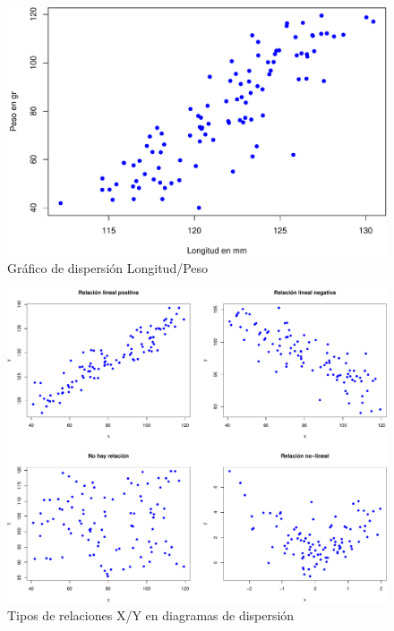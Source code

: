 \documentclass[]{article}
\numberwithin{equation}{section}
\begin{document}
\begin{figure}

{\centering \includegraphics{tema3_files/figure-latex/unnamed-chunk-2-1} 

}

\caption{Gráfico de dispersión Longitud/Peso}\label{fig:unnamed-chunk-2}
\end{figure}

\begin{figure}

{\centering \includegraphics{tema3_files/figure-latex/unnamed-chunk-3-1} 

}

\caption{Tipos de relaciones X/Y en diagramas de dispersión}\label{fig:unnamed-chunk-3}
\end{figure}
\end{document}
